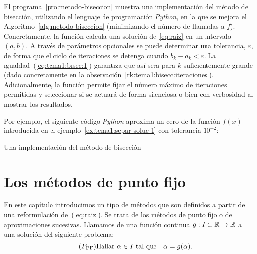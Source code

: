 \begin{test}
  El programa~\ref{pro:metodo-biseccion} muestra una implementación
  del método de bisección, utilizando el lenguaje de programación
  \textit{Python}, en la que se mejora el
  Algoritmo~\ref{alg:metodo-biseccion} (minimizando el número de
  llamadas a $f$). Concretamente, la función
   calcula una solución
  de~\eqref{eq:raiz} en un intervalo $(a,b)$. A través de parámetros
  opcionales se puede determinar una tolerancia, $\varepsilon$, de
  forma que el ciclo de iteraciones se detenga cuando
  $b_k-a_k<\varepsilon$. La igualdad~(\ref{eq:tema1:bisec:1})
  garantiza que así sera para $k$ suficientemente grande (dado
  concretamente en la
  observación~\ref{rk:tema1:bisecc:iteraciones}). Adicionalmente, la
  función permite fijar el número máximo de iteraciones permitidas y
  seleccionar si se actuará de forma silenciosa o bien con
  verbosidad al mostrar los resultados.

  Por ejemplo, el siguiente código \textit{Python} aproxima un cero de
  la función $f(x)$ introducida en el
  ejemplo~\ref{ex:tema1:separ-soluc-1}
  con tolerancia $10^{-2}$:
  \begin{pythonoutput}
  \end{pythonoutput}
\end{test}


\begin{program}
  \caption{Una implementación del método de bisección}
  \label{pro:metodo-biseccion}
\end{program}


\section{Los métodos de punto fijo}
\label{sec:metodos-de-punto-fijo}

En este capítulo introducimos un tipo de métodos que son definidos a
partir de una reformulación de~(\ref{eq:raiz}). Se trata de los
métodos de punto fijo o de aproximaciones sucesivas.
Llamamos  de una función continua
$g:I\subset\operatorname{{\mathbb R}}\to\operatorname{{\mathbb R}}$ a una solución del siguiente  problema:
\begin{equation}
  \tag{$P_{\text{PF}}$}
  \text{Hallar $\cero\in I$ tal que} \quad \cero=g(\cero).
  \label{eq:punto-fijo}
\end{equation}

